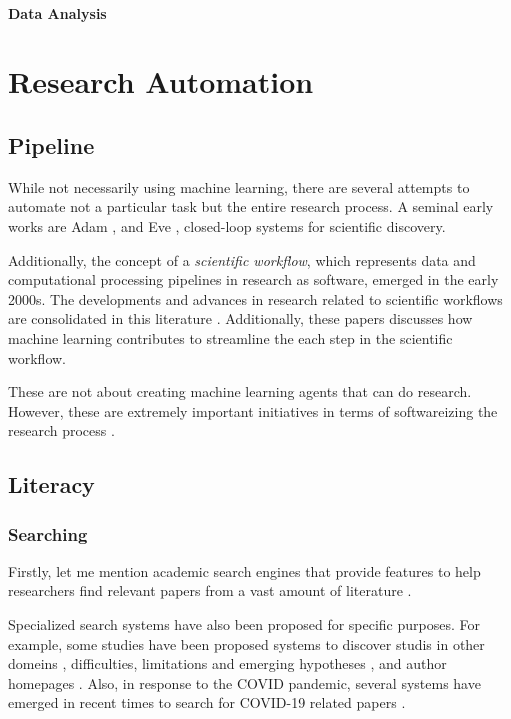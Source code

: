 \documentclass{book}
\begin{document}
\subsubsection{Data Analysis}


\chapter{Research Automation}

\section{Pipeline}
While not necessarily using machine learning, there are several attempts to automate not a particular task but the entire research process. A seminal early works are Adam \cite{king2004functional}, and Eve \cite{williams2015cheaper}, closed-loop systems for scientific discovery. 

Additionally, the concept of a \textit{scientific workflow}, which represents data and computational processing pipelines in research as software, emerged in the early 2000s. The developments and advances in research related to scientific workflows are consolidated in this literature \cite{barker2008scientific,atkinson2017scientific}. Additionally, these papers \cite{deelman2019role,nouri2021exploring} discusses how machine learning contributes to streamline the each step in the scientific workflow.

These are not about creating machine learning agents that can do research. However, these are extremely important initiatives in terms of softwareizing the research process \cite{deelman2015pegasus,gil2011semantic}.

\section{Literacy}

\subsection{Searching}

Firstly, let me mention academic search engines that provide features to help researchers find relevant papers from a vast amount of literature \cite{googlescholar,semanticscholar,dblp,pubmed,citeseerx}. 

Specialized search systems have also been proposed for specific purposes. For example, some studies have been proposed systems to discover studis in other domeins \cite{kang2022augmenting}, difficulties, limitations and emerging hypotheses \cite{lahav2022search}, and author homepages \cite{patel2021author}. Also, in response to the COVID pandemic, several systems have emerged in recent times to search for COVID-19 related papers \cite{hope2020scisight}.
\end{document}
